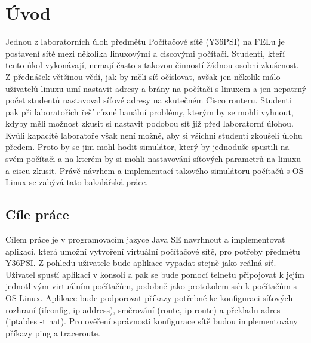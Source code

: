 \chapter{Úvod}




Jednou z laboratorních úloh předmětu Počítačové sítě (Y36PSI) na FELu je postavení sítě mezi několika linuxovými a ciscovými počítači. Studenti, kteří tento úkol vykonávají, nemají často s takovou činností žádnou osobní zkušenost. Z přednášek většinou vědí, jak by měli síť očíslovat, avšak jen několik málo uživatelů linuxu umí nastavit adresy a brány na počítači s linuxem a jen nepatrný počet studentů nastavoval síťové adresy na skutečném Cisco routeru. Studenti pak při laboratořích řeší různé banální problémy, kterým by se mohli vyhnout, kdyby měli možnost zkusit si nastavit podobou síť již před laboratorní úlohou. Kvůli kapacitě laboratoře však není možné, aby si všichni studenti zkoušeli úlohu předem. Proto by se jim mohl hodit simulátor, který by jednoduše spustili na svém počítači a na kterém by si mohli nastavování síťových parametrů na linuxu a ciscu zkusit. Právě návrhem a implementací takového simulátoru počítačů s OS Linux se zabývá tato bakalářská práce. 


\section{Cíle práce}

Cílem práce je v programovacím jazyce Java SE navrhnout a implementovat aplikaci, která umožní vytvoření virtuální počítačové sítě, pro potřeby předmětu Y36PSI. Z pohledu uživatele bude aplikace vypadat stejně jako reálná síť. Uživatel spustí aplikaci v konsoli a pak se bude pomocí telnetu připojovat k jejím jednotlivým virtuálním počítačům, podobně jako protokolem ssh k počítačům s OS Linux. Aplikace bude podporovat příkazy potřebné ke konfiguraci síťových rozhraní (ifconfig, ip address), směrování (route, ip route) a překladu adres (iptables -t nat). Pro ověření správnosti konfigurace sítě budou implementovány příkazy ping a traceroute.

